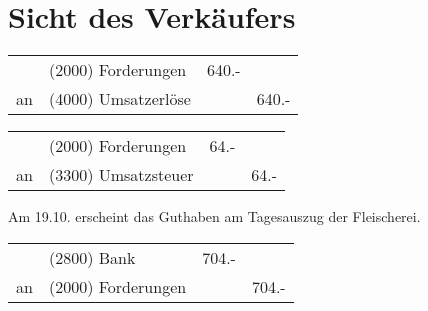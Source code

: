 \documentclass[parskip=half,12pt,a4paper]{scrartcl}
\begin{document}
\section{Sicht des Verkäufers}

\begin{center}
	\begin{tabularx}{\textwidth}{rXrr}
		\toprule
		& (2000) Forderungen & 640.- &\\
		an & (4000) Umsatzerlöse & & 640.- \\
		\bottomrule
	\end{tabularx}
\end{center}

\begin{center}
	\begin{tabularx}{\textwidth}{rXrr}
		\toprule
		& (2000) Forderungen & 64.- &\\
		an & (3300) Umsatzsteuer & & 64.-\\
		\bottomrule
	\end{tabularx}
\end{center}

Am 19.10. erscheint das Guthaben am Tagesauszug der Fleischerei.

\begin{center}
	\begin{tabularx}{\textwidth}{rXrr}
		\toprule
		& (2800) Bank & 704.- &\\
		an & (2000) Forderungen & & 704.- \\
		\bottomrule
	\end{tabularx}
\end{center}
\end{document}
